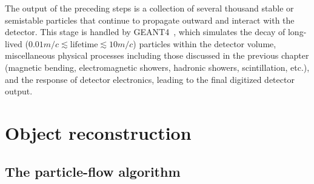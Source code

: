 \documentclass[oneside, letterpaper, 12pt, oldfontcommands]{memoir}
\begin{document}
The output of the preceding steps is a collection of several thousand stable or semistable particles that continue to propagate outward and interact
with the detector. This stage is handled by GEANT4~\cite{ref:S0168-9002(03)01368-8}, which simulates the decay of long-lived
($0.01\unit{m}/c \lesssim \mathrm{lifetime} \lesssim 10\unit{m}/c$) particles within the detector volume, miscellaneous physical processes including those
discussed in the previous chapter (magnetic bending, electromagnetic showers, hadronic showers, scintillation, etc.), and the response of detector electronics,
leading to the final digitized detector output.

\chapter{Object reconstruction} \label{chap:reconstruction}
\section{The particle-flow algorithm} \label{sec:reconstruction_particle_flow}

\end{document}
